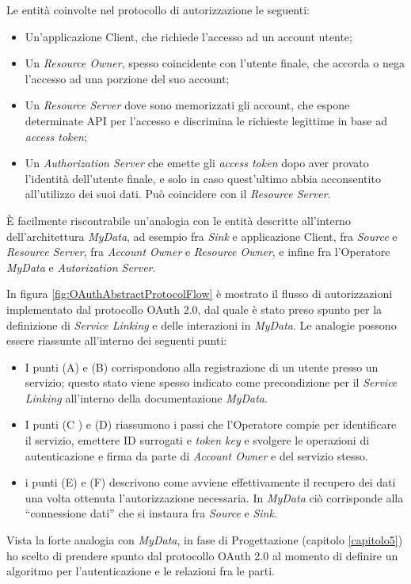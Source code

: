 Le entit\`a coinvolte nel protocollo di autorizzazione le seguenti:
\begin{itemize}
	\item Un’applicazione Client, che richiede l’accesso ad un account utente;
	\item Un \textit{Resource Owner}, spesso coincidente con l’utente finale, che accorda o nega l’accesso ad una porzione del suo account;
	\item Un \textit{Resource Server} dove sono memorizzati gli account, che espone determinate API per l’accesso e discrimina le richieste legittime in base ad \textit{access token};
	\item Un \textit{Authorization Server} che emette gli \textit{access token} dopo aver provato l’identit\`a dell’utente finale, e solo in caso quest’ultimo abbia acconsentito all’utilizzo dei suoi dati. Pu\`o coincidere con il \textit{Resource Server}.
\end{itemize}
\`E facilmente riscontrabile un’analogia con le entit\`a descritte all’interno dell’architettura \textit{MyData}, ad esempio fra \textit{Sink} e applicazione Client, fra \textit{Source} e \textit{Resource Server}, fra \textit{Account Owner} e \textit{Resource Owner}, e infine fra l’Operatore \textit{MyData} e \textit{Autorization Server}.

In figura \ref{fig:OAuthAbstractProtocolFlow} \`e mostrato il flusso di autorizzazioni implementato dal protocollo OAuth 2.0, dal quale \`e stato preso spunto per la definizione di \textit{Service Linking} e delle interazioni in \textit{MyData}. Le analogie possono essere riassunte all’interno dei seguenti punti:
\begin{itemize}
	\item I punti (A) e (B) corrispondono alla registrazione di un utente presso un servizio; questo stato viene spesso indicato come precondizione per il \textit{Service Linking} all’interno della documentazione \textit{MyData}.
	\item I punti (C ) e (D) riassumono i passi che l’Operatore compie per identificare il servizio, emettere ID surrogati e \textit{token key} e svolgere le operazioni di autenticazione e firma da parte di \textit{Account Owner} e del servizio stesso.
	\item i punti (E) e (F) descrivono come avviene effettivamente il recupero dei dati una volta ottenuta l’autorizzazione necessaria. In \textit{MyData} ci\`o corrisponde alla “connessione dati” che si instaura fra \textit{Source} e \textit{Sink}.
\end{itemize}
Vista la forte analogia con \textit{MyData}, in fase di Progettazione (capitolo \ref{capitolo5}) ho scelto di prendere spunto dal protocollo OAuth 2.0 al momento di definire un algoritmo per l’autenticazione e le relazioni fra le parti. 

